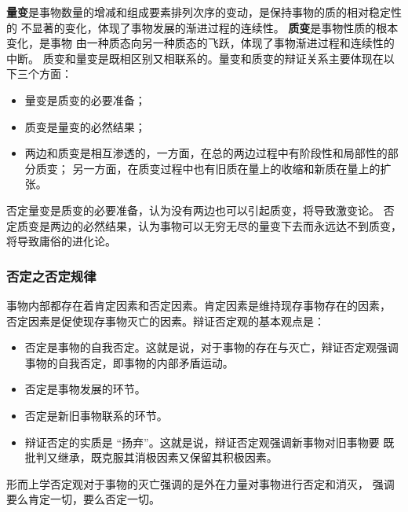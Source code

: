 \documentclass[11pt, UTF8]{book} %
\begin{document}
\textbf{量变}是事物数量的增减和组成要素排列次序的变动，是保持事物的质的相对稳定性的
不显著的变化，体现了事物发展的渐进过程的连续性。
\textbf{质变}是事物性质的根本变化，是事物
由一种质态向另一种质态的飞跃，体现了事物渐进过程和连续性的中断。
质变和量变是既相区别又相联系的。量变和质变的辩证关系主要体现在以下三个方面：
\begin{itemize}[itemsep=0pt]
    \item 量变是质变的必要准备；
    \item 质变是量变的必然结果；
    \item 两边和质变是相互渗透的，一方面，在总的两边过程中有阶段性和局部性的部分质变；
    另一方面，在质变过程中也有旧质在量上的收缩和新质在量上的扩张。
\end{itemize}
否定量变是质变的必要准备，认为没有两边也可以引起质变，将导致激变论。
否定质变是两边的必然结果，认为事物可以无穷无尽的量变下去而永远达不到质变，
将导致庸俗的进化论。

\subsubsection{否定之否定规律}

事物内部都存在着肯定因素和否定因素。肯定因素是维持现存事物存在的因素，
否定因素是促使现存事物灭亡的因素。辩证否定观的基本观点是：
\begin{itemize}[itemsep=0pt]
    \item 否定是事物的自我否定。这就是说，对于事物的存在与灭亡，辩证否定观强调
    事物的自我否定，即事物的内部矛盾运动。
    \item 否定是事物发展的环节。
    \item 否定是新旧事物联系的环节。
    \item 辩证否定的实质是 “扬弃”。这就是说，辩证否定观强调新事物对旧事物要
    既批判又继承，既克服其消极因素又保留其积极因素。
\end{itemize}
形而上学否定观对于事物的灭亡强调的是外在力量对事物进行否定和消灭，
强调要么肯定一切，要么否定一切。
\end{document}
